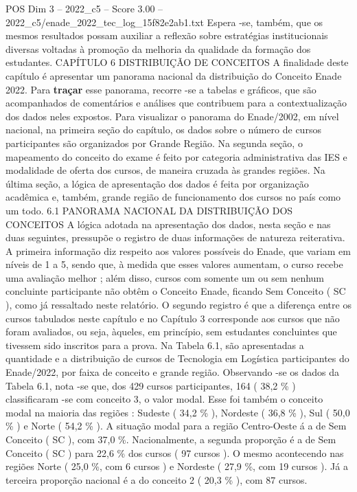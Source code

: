 \begin{textsample}{POS Dim 3 – 2022\_c5 – Score 3.00 – 2022\_c5/enade\_2022\_tec\_log\_15f82e2ab1.txt}
Espera -se, também, que os mesmos resultados possam auxiliar a reflexão sobre estratégias institucionais diversas voltadas à promoção da melhoria da qualidade da formação dos estudantes.
CAPÍTULO 6 DISTRIBUIÇÃO DE CONCEITOS A finalidade deste capítulo é apresentar um panorama nacional da distribuição do Conceito Enade 2022.
Para \textbf{traçar} esse panorama, recorre -se a tabelas e gráficos, que são acompanhados de comentários e análises que contribuem para a contextualização dos dados neles expostos.
Para visualizar o panorama do Enade/2002, em nível nacional, na primeira seção do capítulo, os dados sobre o número de cursos participantes são organizados por Grande Região.
Na segunda seção, o mapeamento do conceito do exame é feito por categoria administrativa das IES e modalidade de oferta dos cursos, de maneira cruzada às grandes regiões.
Na última seção, a lógica de apresentação dos dados é feita por organização acadêmica e, também, grande região de funcionamento dos cursos no país como um todo. 6.1 PANORAMA NACIONAL DA DISTRIBUIÇÃO DOS CONCEITOS A lógica adotada na apresentação dos dados, nesta seção e nas duas seguintes, pressupõe o registro de duas informações de natureza reiterativa.
A primeira informação diz respeito aos valores possíveis do Enade, que variam em níveis de 1 a 5, sendo que, à medida que esses valores aumentam, o curso recebe uma avaliação melhor ; além disso, cursos com somente um ou sem nenhum concluinte participante não obtêm o Conceito Enade, ficando Sem Conceito ( SC ), como já ressaltado neste relatório.
O segundo registro é que a diferença entre os cursos tabulados neste capítulo e no Capítulo 3 corresponde aos cursos que não foram avaliados, ou seja, àqueles, em princípio, sem estudantes concluintes que tivessem sido inscritos para a prova.
Na Tabela 6.1, são apresentadas a quantidade e a distribuição de cursos de Tecnologia em Logística participantes do Enade/2022, por faixa de conceito e grande região.
Observando -se os dados da Tabela 6.1, nota -se que, dos 429 cursos participantes, 164 ( 38,2 \% ) classificaram -se com conceito 3, o valor modal.
Esse foi também o conceito modal na maioria das regiões : Sudeste ( 34,2 \% ), Nordeste ( 36,8 \% ), Sul ( 50,0 \% ) e Norte ( 54,2 \% ).
A situação modal para a região Centro-Oeste á a de Sem Conceito ( SC ), com 37,0 \%.
Nacionalmente, a segunda proporção é a de Sem Conceito ( SC ) para 22,6 \% dos cursos ( 97 cursos ).
O mesmo acontecendo nas regiões Norte ( 25,0 \%, com 6 cursos ) e Nordeste ( 27,9 \%, com 19 cursos ).
Já a terceira proporção nacional é a do conceito 2 ( 20,3 \% ), com 87 cursos.

\end{textsample}
